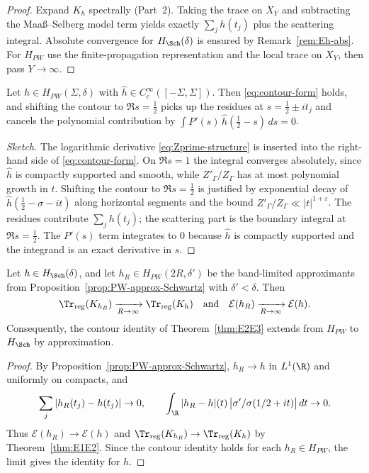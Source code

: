 \begin{proof}
Expand $K_h$ spectrally (Part~2). Taking the trace on $X_Y$ and subtracting the Maaß–Selberg model term yields exactly $\sum_j h(t_j)$ plus the scattering integral. Absolute convergence for $H_{\Sch}(\delta)$ is ensured by Remark~\ref{rem:Eh-abs}. For $H_{PW}$ use the finite-propagation representation and the local trace on $X_Y$, then pass $Y\to\infty$.
\end{proof}

\begin{theorem}
\label{thm:E2E3}
Let $h\in H_{PW}(\Sigma,\delta)$ with $\widehat h\in C_c^\infty([-\Sigma,\Sigma])$. Then \eqref{eq:contour-form} holds, and shifting the contour to $\Re s=\frac12$ picks up the residues at $s=\tfrac12\pm it_j$ and cancels the polynomial contribution by $\int P'(s)\,\widehat h(\tfrac12-s)\,ds=0$.
\end{theorem}

\begin{proof}[Sketch]
The logarithmic derivative \eqref{eq:Zprime-structure} is inserted into the right-hand side of \eqref{eq:contour-form}. On $\Re s=1$ the integral converges absolutely, since $\widehat h$ is compactly supported and smooth, while $Z'_\Gamma/Z_\Gamma$ has at most polynomial growth in $t$. Shifting the contour to $\Re s=\frac12$ is justified by exponential decay of $\widehat h(\tfrac12-\sigma-it)$ along horizontal segments and the bound $Z'_\Gamma/Z_\Gamma\ll |t|^{1+\varepsilon}$. The residues contribute $\sum_j h(t_j)$; the scattering part is the boundary integral at $\Re s=\frac12$. The $P'(s)$ term integrates to $0$ because $\widehat h$ is compactly supported and the integrand is an exact derivative in $s$.
\end{proof}

\begin{theorem}
\label{thm:DC-lock}
Let $h\in H_{\Sch}(\delta)$, and let $h_R\in H_{PW}(2R,\delta')$ be the band-limited approximants from Proposition~\textup{\ref{prop:PW-approx-Schwartz}} with $\delta'<\delta$. Then
\[
  \Tr_{\mathrm{reg}}(K_{h_R}) \xrightarrow[R\to\infty]{} \Tr_{\mathrm{reg}}(K_h)
  \quad\text{and}\quad
  \mathcal{E}(h_R) \xrightarrow[R\to\infty]{} \mathcal{E}(h).
\]
Consequently, the contour identity of Theorem~\textup{\ref{thm:E2E3}} extends from $H_{PW}$ to $H_{\Sch}$ by approximation.
\end{theorem}

\begin{proof}
By Proposition~\ref{prop:PW-approx-Schwartz}, $h_R\to h$ in $L^1(\R)$ and uniformly on compacts, and
\[
  \sum_j |h_R(t_j)-h(t_j)| \to 0,\qquad
  \int_{\R} |h_R-h|(t)\,\big|\sigma'/\sigma(1/2+it)\big|\,dt \to 0.
\]
Thus $\mathcal{E}(h_R)\to\mathcal{E}(h)$ and $\Tr_{\mathrm{reg}}(K_{h_R})\to\Tr_{\mathrm{reg}}(K_h)$ by Theorem~\ref{thm:E1E2}. Since the contour identity holds for each $h_R\in H_{PW}$, the limit gives the identity for $h$.
\end{proof}

